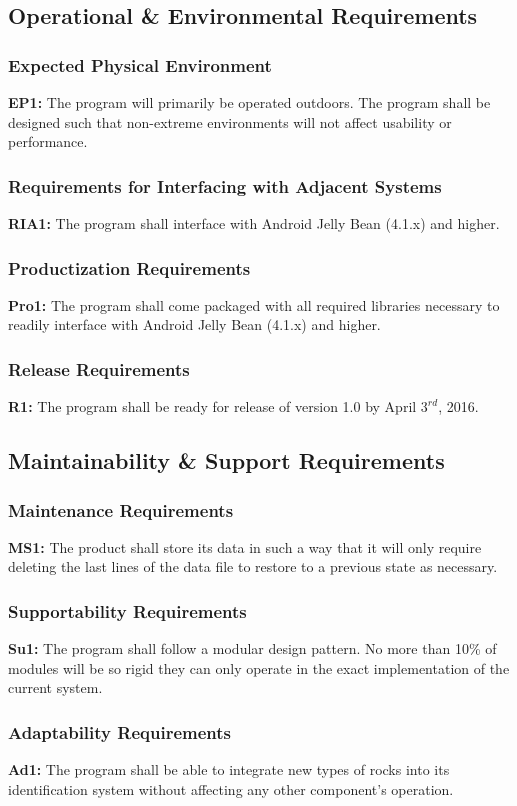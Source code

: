 \documentclass[titlepage]{article}
\begin{document}
\subsection{Operational \& Environmental Requirements}
\subsubsection{Expected Physical Environment}
\textbf{EP1:} The program will primarily be operated outdoors. The program shall be designed such that non-extreme environments will not affect usability or performance.
\subsubsection{Requirements for Interfacing with Adjacent Systems}
\textbf{RIA1:} The program shall interface with Android Jelly Bean (4.1.x) and higher.
\subsubsection{Productization Requirements}
\textbf{Pro1:} The program shall come packaged with all required libraries necessary to readily interface with Android Jelly Bean (4.1.x) and higher.
\subsubsection{Release Requirements}
\textbf{R1:} The program shall be ready for release of version 1.0 by April $3^{rd}$, 2016.

\subsection{Maintainability \& Support Requirements}
\subsubsection{Maintenance Requirements}
\textbf{MS1:} The product shall store its data in such a way that it will only require deleting the last lines of the data file to restore to a previous state as necessary.
\subsubsection{Supportability Requirements}
\textbf{Su1:} The program shall follow a modular design pattern. No more than 10\% of modules will be so rigid they can only operate in the exact implementation of the current system.
\subsubsection{Adaptability Requirements}
\textbf{Ad1:} The program shall be able to integrate new types of rocks into its identification system without affecting any other component's operation.
\end{document}
